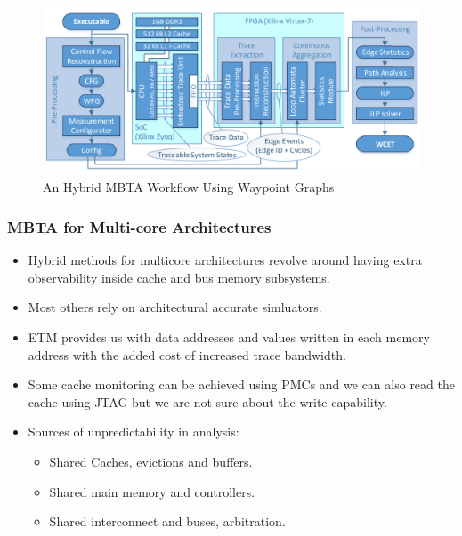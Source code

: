\documentclass{beamer}
\begin{document}
\begin{frame}
    \begin{figure}
        \centering
        \includegraphics[width=0.90\columnwidth]{wcet.png}
        \caption{An Hybrid MBTA Workflow Using Waypoint Graphs}
        \label{fig:wcet}
    \end{figure}
\end{frame}
\begin{frame}
    \frametitle{MBTA for Multi-core Architectures}
    \begin{itemize}
        \item Hybrid methods for multicore architectures revolve around having
            extra observability inside cache and bus memory subsystems.
        \item Most others rely on architectural accurate simluators.
        \item ETM provides us with data addresses and values written in each
            memory address with the added cost of increased trace bandwidth.
        \item Some cache monitoring can be achieved using PMCs and we can also
            read the cache using JTAG but we are not sure about the write
            capability.
        \item Sources of unpredictability in analysis:
            \begin{itemize}
                \item Shared Caches, evictions and buffers.
                \item Shared main memory and controllers.
                \item Shared interconnect and buses, arbitration.
            \end{itemize}
    \end{itemize}
\end{frame}
\end{document}
